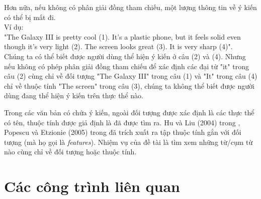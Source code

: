 \documentclass[12pt]{report}
\begin{document}
		\par Hơn nữa, nếu không có phân giải đồng tham chiếu, một lượng thông tin về ý kiến có thể bị mất đi.\\
		Ví dụ:\\
		"The Galaxy III is pretty cool (1). It's a plastic phone, but it feels solid even though it's very light (2). The screen looks great (3). It is very sharp (4)".
		\\Chúng ta có thể biết được người dùng thể hiện ý kiến ở câu (2) và (4). Nhưng nếu không có phép phân giải đồng tham chiếu để xác định các đại từ "it" trong câu (2) cùng chỉ về đối tượng "The Galaxy III" trong câu (1) và "It" trong câu (4) chỉ về thuộc tính "The screen" trong câu (3), chúng ta không thể biết được người dùng đang thể hiện ý kiến trên thực thể nào.
		\par Trong các văn bản có chứa ý kiến, ngoài đối tượng được xác định là các thực thể có tên, thuộc tính được giả định là đã được tìm ra. Hu và Liu (2004) trong \cite{findfeatures1}, Popescu và Etzionie (2005) trong \cite{findfeatures2} đã trích xuất ra tập thuộc tính gắn với đối tượng (mà họ gọi là \textit{features}). Nhiệm vụ của đề tài là tìm xem những từ/cụm từ nào cùng chỉ về đối tượng hoặc thuộc tính.

	\chapter{Các công trình liên quan}			
\end{document}
